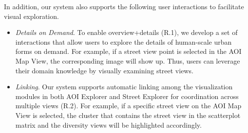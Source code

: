In addition, our system also supports the following user interactions to facilitate visual exploration.
\begin{itemize}

\item
\textit{Details on Demand}.
To enable overview+details (R.1), we develop a set of interactions that allow users to explore the details of human-scale urban forms on demand.
For example, if a street view point is selected in the AOI Map View, the corresponding image will show up.
Thus, users can leverage their domain knowledge by visually examining street views.

\vspace*{-1mm}
\item
\textit{Linking}.
Our system supports automatic linking among the visualization modules in both AOI Explorer and Street Explorer for coordination across multiple views (R.2).
For example, if a specific street view on the AOI Map View is selected, the cluster that contains the street view in the scatterplot matrix and the diversity views will be highlighted accordingly.

\end{itemize}